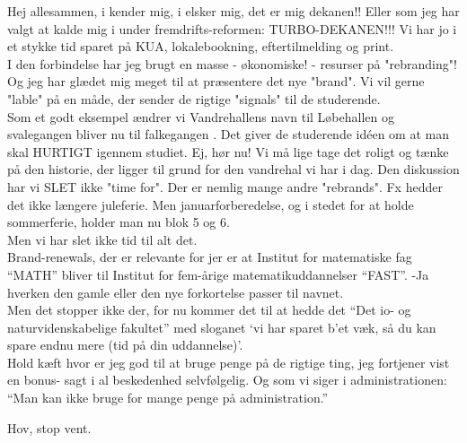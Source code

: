 \documentclass[a4paper,11pt]{article}
\begin{document}
\begin{sketch}
 Hej allesammen, i kender mig, i elsker mig, det er mig dekanen!! Eller som jeg har valgt at kalde mig i under fremdrifts-reformen: TURBO-DEKANEN!!!
 Vi har jo i et stykke tid sparet på KUA, lokalebookning, eftertilmelding og print. \\
I den forbindelse har jeg brugt en masse - økonomiske! - resurser på "rebranding"! Og jeg har glædet mig meget til at præsentere det nye "brand".
Vi vil gerne "lable" på en måde, der sender de rigtige "signals" til de studerende. \\
Som et godt eksempel ændrer vi Vandrehallens navn til Løbehallen og svalegangen bliver nu til falkegangen .
Det giver de studerende idéen om at man skal HURTIGT igennem studiet.
 Ej, hør nu! Vi må lige tage det roligt og tænke på den historie, der ligger til grund for den vandrehal vi har i dag.
  Den diskussion har vi SLET ikke "time for". Der er nemlig mange andre "rebrands". Fx hedder det ikke længere juleferie. Men januarforberedelse, og i stedet for at holde sommerferie, holder man nu blok 5 og 6. \\
Men vi har slet ikke tid til alt det. \\
Brand-renewals, der er relevante for jer er at  Institut for matematiske fag “MATH” bliver til Institut for fem-årige matematikuddannelser “FAST”.  -Ja hverken den gamle eller den nye forkortelse passer til navnet. \\
Men det stopper ikke der, for nu kommer det til at hedde det “Det io- og naturvidenskabelige fakultet” med sloganet ‘vi har sparet b’et væk, så du kan spare endnu mere (tid på din uddannelse)’. \\
Hold kæft hvor er jeg god til at bruge penge på de rigtige ting, jeg fortjener vist en bonus- sagt i al beskedenhed selvfølgelig. Og som vi siger i administrationen: “Man kan ikke bruge for mange penge på administration.”

 Hov, stop vent.


\end{sketch}
\end{document}
